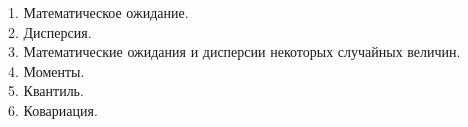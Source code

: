 
1. Математическое ожидание. \\


2. Дисперсия. \\


3. Математические ожидания и дисперсии некоторых случайных величин. \\


4. Моменты.\\


5. Квантиль.\\


6. Ковариация.\\
